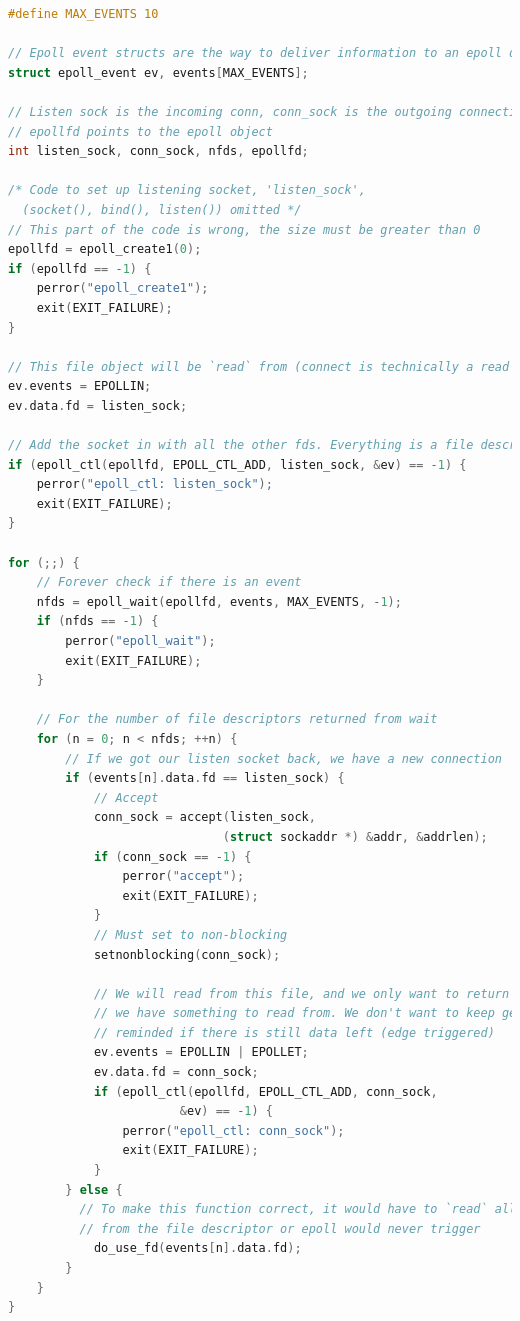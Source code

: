\begin{lstlisting}[language=C]
#define MAX_EVENTS 10

// Epoll event structs are the way to deliver information to an epoll device
struct epoll_event ev, events[MAX_EVENTS];

// Listen sock is the incoming conn, conn_sock is the outgoing connection, nfds is number of file des
// epollfd points to the epoll object
int listen_sock, conn_sock, nfds, epollfd;

/* Code to set up listening socket, 'listen_sock',
  (socket(), bind(), listen()) omitted */
// This part of the code is wrong, the size must be greater than 0
epollfd = epoll_create1(0);
if (epollfd == -1) {
    perror("epoll_create1");
    exit(EXIT_FAILURE);
}

// This file object will be `read` from (connect is technically a read operation)
ev.events = EPOLLIN;
ev.data.fd = listen_sock;

// Add the socket in with all the other fds. Everything is a file descriptor
if (epoll_ctl(epollfd, EPOLL_CTL_ADD, listen_sock, &ev) == -1) {
    perror("epoll_ctl: listen_sock");
    exit(EXIT_FAILURE);
}

for (;;) {
    // Forever check if there is an event
    nfds = epoll_wait(epollfd, events, MAX_EVENTS, -1);
    if (nfds == -1) {
        perror("epoll_wait");
        exit(EXIT_FAILURE);
    }

    // For the number of file descriptors returned from wait
    for (n = 0; n < nfds; ++n) {
        // If we got our listen socket back, we have a new connection
        if (events[n].data.fd == listen_sock) {
            // Accept
            conn_sock = accept(listen_sock,
                              (struct sockaddr *) &addr, &addrlen);
            if (conn_sock == -1) {
                perror("accept");
                exit(EXIT_FAILURE);
            }
            // Must set to non-blocking
            setnonblocking(conn_sock);

            // We will read from this file, and we only want to return once
            // we have something to read from. We don't want to keep getting
            // reminded if there is still data left (edge triggered)
            ev.events = EPOLLIN | EPOLLET;
            ev.data.fd = conn_sock;
            if (epoll_ctl(epollfd, EPOLL_CTL_ADD, conn_sock,
                        &ev) == -1) {
                perror("epoll_ctl: conn_sock");
                exit(EXIT_FAILURE);
            }
        } else {
          // To make this function correct, it would have to `read` all the data
          // from the file descriptor or epoll would never trigger
            do_use_fd(events[n].data.fd);
        }
    }
}

\end{lstlisting}


